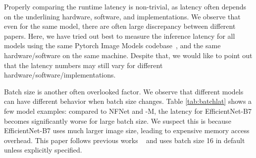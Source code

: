 \documentclass{article}
\begin{document}
Properly comparing the runtime latency is non-trivial, as latency often depends on the underlining hardware, software, and implementations. We observe that even for the same model, there are often large discrepancy between different papers. Here, we have tried out best to measure the inference latency for all models using the same Pytorch Image Models codebase~\cite{pytorchimagemodel}, and the same hardware/software on the same machine. Despite that, we would like to point out that the latency numbers may still vary for different hardware/software/implementations.


\begin{table}[!ht]
    \vskip -0.1in
    \caption{Throughtput (imgs/sec/gpu) comparison (higher is better). All models have similar ImageNet top-1 accuracy.
    }
    \centering
\label{tab:batchlat} 
\end{table}


Batch size is another often overlooked factor. We observe that different models can have different behavior when batch size changes. Table \ref{tab:batchlat} shows a few model examples: compared to NFNet and {\xnet}-M, the latency for EfficientNet-B7 becomes significantly worse for large batch size. We suspect this is because EfficientNet-B7 uses much larger image size, leading to expensive memory access overhead. This paper follows previous works ~\cite{resnest20} and uses batch size 16 in default unless explicitly specified.



 
\end{document}
